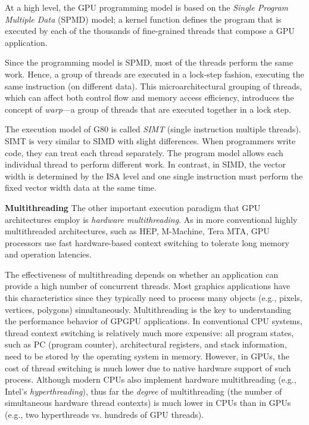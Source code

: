 \documentclass[twocolumn]{article}
\begin{document}
At a high level, the GPU programming model is based on the \textit{Single Program Multiple Data} (SPMD) model; a kernel function defines the program that is executed by each of the thousands of fine-grained threads that compose a GPU application. 

Since the programming model is SPMD, most of the threads perform the same work. Hence, a group of threads are executed in a lock-step fashion, executing the same instruction (on different data). This microarchitectural grouping of threads, which can affect both control flow and memory access efficiency, introduces the concept of \textit{warp}—a group of threads that are executed together in a lock step.

The execution model of G80 is called \textit{SIMT} (single instruction multiple threads). SIMT is very similar to SIMD with slight differences. When programmers write code, they can treat each thread separately. The program model allows each individual thread to perform different work. In contrast, in SIMD, the vector width is determined by the ISA level and one single instruction must perform the fixed vector width data at the same time. 

\noindent
\textbf{Multithreading} The other important execution paradigm that GPU architectures employ is \textit{hardware multithreading}. As in more conventional highly multithreaded architectures, such as HEP, M-Machine, Tera MTA, GPU processors use fast hardware-based context switching to tolerate long memory and operation latencies.

The effectiveness of multithreading depends on whether an application can provide a high number of concurrent threads. Most graphics applications have this characteristics since they typically need to process many objects (e.g., pixels, vertices, polygons) simultaneously. Multithreading is the key to understanding the performance behavior of GPGPU applications. In conventional CPU systems, thread context switching is relatively much more expensive: all program states, such as PC (program counter), architectural registers, and stack information, need to be stored by the operating system in memory. However, in GPUs, the cost of thread switching is much lower due to native hardware support of such process. Although modern CPUs also implement hardware multithreading (e.g., Intel’s \textit{hyperthreading}), thus far the \textit{degree} of multithreading (the number of simultaneous hardware thread contexts) is much lower in CPUs than in GPUs (e.g., two hyperthreads vs. hundreds of GPU threads).
\end{document}
